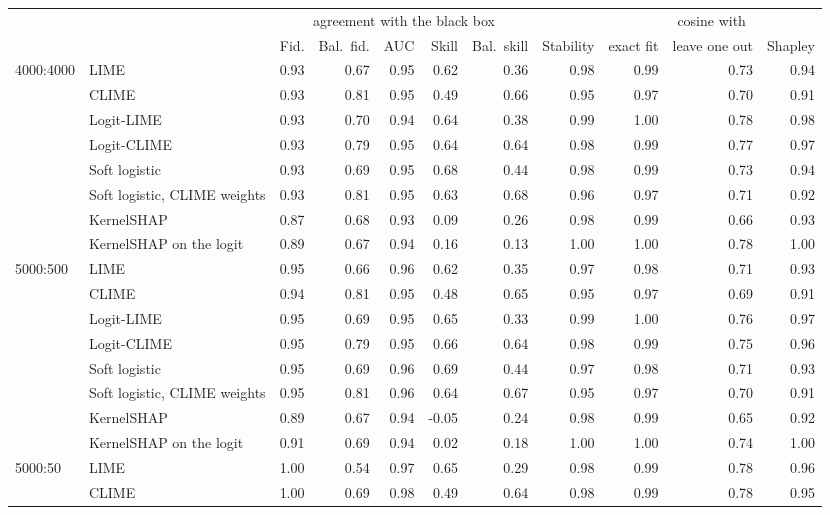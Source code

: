 \begin{tabular}{@{}llrrrrrrrrr@{}}
  \toprule
   &  & \multicolumn{5}{c}{agreement with the black box} &  & \multicolumn{3}{c}{cosine with} \\
  \cmidrule(lr){3-7} \cmidrule(lr){9-11}
   &  & Fid. & Bal.\ fid. & AUC & Skill & Bal.\ skill & Stability & exact fit & leave one out & Shapley \\
  \midrule
  4000:4000 & LIME & 0.93 & 0.67 & 0.95 & 0.62 & 0.36 & 0.98 & 0.99 & 0.73 & 0.94 \\
   & CLIME & 0.93 & 0.81 & 0.95 & 0.49 & 0.66 & 0.95 & 0.97 & 0.70 & 0.91 \\
   & Logit-LIME & 0.93 & 0.70 & 0.94 & 0.64 & 0.38 & 0.99 & 1.00 & 0.78 & 0.98 \\
   & Logit-CLIME & 0.93 & 0.79 & 0.95 & 0.64 & 0.64 & 0.98 & 0.99 & 0.77 & 0.97 \\
   & Soft logistic & 0.93 & 0.69 & 0.95 & 0.68 & 0.44 & 0.98 & 0.99 & 0.73 & 0.94 \\
   & Soft logistic, CLIME weights & 0.93 & 0.81 & 0.95 & 0.63 & 0.68 & 0.96 & 0.97 & 0.71 & 0.92 \\
   & KernelSHAP & 0.87 & 0.68 & 0.93 & 0.09 & 0.26 & 0.98 & 0.99 & 0.66 & 0.93 \\
   & KernelSHAP on the logit & 0.89 & 0.67 & 0.94 & 0.16 & 0.13 & 1.00 & 1.00 & 0.78 & 1.00 \\
  \midrule
  5000:500 & LIME & 0.95 & 0.66 & 0.96 & 0.62 & 0.35 & 0.97 & 0.98 & 0.71 & 0.93 \\
   & CLIME & 0.94 & 0.81 & 0.95 & 0.48 & 0.65 & 0.95 & 0.97 & 0.69 & 0.91 \\
   & Logit-LIME & 0.95 & 0.69 & 0.95 & 0.65 & 0.33 & 0.99 & 1.00 & 0.76 & 0.97 \\
   & Logit-CLIME & 0.95 & 0.79 & 0.95 & 0.66 & 0.64 & 0.98 & 0.99 & 0.75 & 0.96 \\
   & Soft logistic & 0.95 & 0.69 & 0.96 & 0.69 & 0.44 & 0.97 & 0.98 & 0.71 & 0.93 \\
   & Soft logistic, CLIME weights & 0.95 & 0.81 & 0.96 & 0.64 & 0.67 & 0.95 & 0.97 & 0.70 & 0.91 \\
   & KernelSHAP & 0.89 & 0.67 & 0.94 & -0.05 & 0.24 & 0.98 & 0.99 & 0.65 & 0.92 \\
   & KernelSHAP on the logit & 0.91 & 0.69 & 0.94 & 0.02 & 0.18 & 1.00 & 1.00 & 0.74 & 1.00 \\
  \midrule
  5000:50 & LIME & 1.00 & 0.54 & 0.97 & 0.65 & 0.29 & 0.98 & 0.99 & 0.78 & 0.96 \\
   & CLIME & 1.00 & 0.69 & 0.98 & 0.49 & 0.64 & 0.98 & 0.99 & 0.78 & 0.95 \\

\end{tabular}
